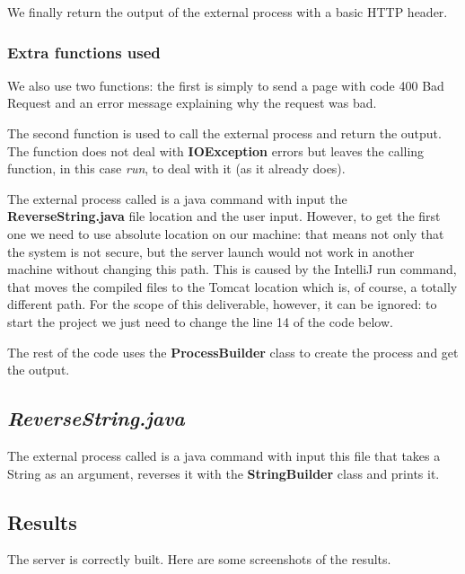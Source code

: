 \documentclass[12pt, a4paper]{article}
\begin{document}
  We finally return the output of the external process with a basic HTTP header.

  

  \subsubsection{Extra functions used}

  We also use two functions: the first is simply to send a page with code 400 Bad Request and an error message explaining why the request was bad.

  The second function is used to call the external process and return the output. The function does not deal with \textbf{IOException} errors but leaves the calling function, in this case \textit{run}, to deal with it (as it already does).

  The external process called is a java command with input the \textbf{ReverseString.java} file location and the user input. However, to get the first one we need to use absolute location on our machine: that means not only that the system is not secure, but the server launch would not work in another machine without changing this path. This is caused by the IntelliJ run command, that moves the compiled files to the Tomcat location which is, of course, a totally different path. For the scope of this deliverable, however, it can be ignored: to start the project we just need to change the line 14 of the code below.

  The rest of the code uses the \textbf{ProcessBuilder} class to create the process and get the output.

   

  \subsection{\textit{ReverseString.java}}
  The external process called is a java command with input this file that takes a String as an argument, reverses it with the \textbf{StringBuilder} class and prints it.

  
  
  \subsection{Results}

  The server is correctly built. Here are some screenshots of the results.
\end{document}
